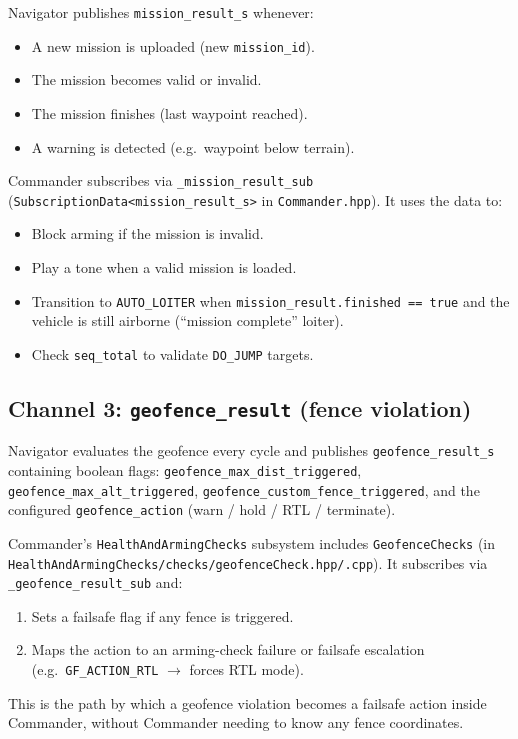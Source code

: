 \documentclass[12pt,a4paper]{article}
\begin{document}
Navigator publishes \texttt{mission\_result\_s} whenever:
\begin{itemize}
  \item A new mission is uploaded (new \texttt{mission\_id}).
  \item The mission becomes valid or invalid.
  \item The mission finishes (last waypoint reached).
  \item A warning is detected (e.g.\ waypoint below terrain).
\end{itemize}

Commander subscribes via \texttt{\_mission\_result\_sub}
(\texttt{SubscriptionData<mission\_result\_s>} in \texttt{Commander.hpp}).
It uses the data to:
\begin{itemize}
  \item Block arming if the mission is invalid.
  \item Play a tone when a valid mission is loaded.
  \item Transition to \texttt{AUTO\_LOITER} when
        \texttt{mission\_result.finished == true} and the vehicle is still
        airborne (``mission complete'' loiter).
  \item Check \texttt{seq\_total} to validate \texttt{DO\_JUMP} targets.
\end{itemize}

\subsection{Channel 3: \texttt{geofence\_result} (fence violation)}

Navigator evaluates the geofence every cycle and publishes
\texttt{geofence\_result\_s} containing boolean flags:
\texttt{geofence\_max\_dist\_triggered},
\texttt{geofence\_max\_alt\_triggered},
\texttt{geofence\_custom\_fence\_triggered},
and the configured \texttt{geofence\_action}
(warn / hold / RTL / terminate).

Commander's \texttt{HealthAndArmingChecks} subsystem includes
\texttt{GeofenceChecks} (in
\texttt{HealthAndArmingChecks/checks/geofenceCheck.hpp/.cpp}).
It subscribes via \texttt{\_geofence\_result\_sub} and:
\begin{enumerate}
  \item Sets a failsafe flag if any fence is triggered.
  \item Maps the action to an arming-check failure or failsafe escalation
        (e.g.\ \texttt{GF\_ACTION\_RTL} $\to$ forces RTL mode).
\end{enumerate}
This is the path by which a geofence violation becomes a failsafe action
inside Commander, without Commander needing to know any fence coordinates.
\end{document}
